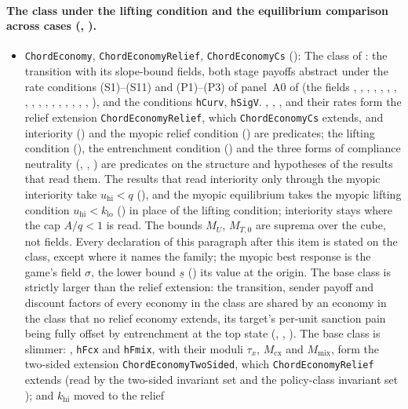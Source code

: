 \paragraph{The class under the lifting condition and the equilibrium comparison across cases (, ).}
\begin{itemize}[leftmargin=1.4em,itemsep=1pt]
\item \texttt{ChordEconomy}, \texttt{ChordEconomyRelief}, \texttt{ChordEconomyCs} (): The class of : the transition with its slope-bound fields, both stage payoffs abstract under the rate conditions (S1)--(S11) and (P1)--(P3) of panel~A0 of  (the fields , , , , , , , , , , , , , , , , , ), and the conditions \texttt{hCurv}, \texttt{hSigV}. , , ,  and their rates form the relief extension \texttt{ChordEconomyRelief}, which \texttt{ChordEconomyCs} extends, and interiority () and the myopic relief condition () are predicates; the lifting condition (), the entrenchment condition () and the three forms of compliance neutrality (, , ) are predicates on the structure and hypotheses of the results that read them. The results that read interiority only through the myopic interiority take $u_{\mathrm{hi}}<q$ (), and the myopic equilibrium takes the myopic lifting condition $u_{\mathrm{hi}}<k_{\mathrm{lo}}$ () in place of the lifting condition; interiority stays where the cap $A/q<1$ is read. The bounds $M_U$, $M_{T,0}$ are suprema over the cube, not fields. Every declaration of this paragraph after this item is stated on the class, except where it names the family; the myopic best response is the game's field $\sigma$, the lower bound $\underline s$ () its value at the origin. The base class is strictly larger than the relief extension: the transition, sender payoff and discount factors of every economy in the class are shared by an economy in the class that no relief economy extends, its target's per-unit sanction pain being fully offset by entrenchment at the top state (, , ). The base class is slimmer: , \texttt{hFcx} and \texttt{hFmix}, with their moduli $\tau_x$, $M_{\mathrm{cx}}$ and $M_{\mathrm{mix}}$, form the two-sided extension \texttt{ChordEconomyTwoSided}, which \texttt{ChordEconomyRelief} extends (read by the two-sided invariant set  and the policy-class invariant set );  and $k_{\mathrm{hi}}$ moved to the relief 
\end{itemize}
